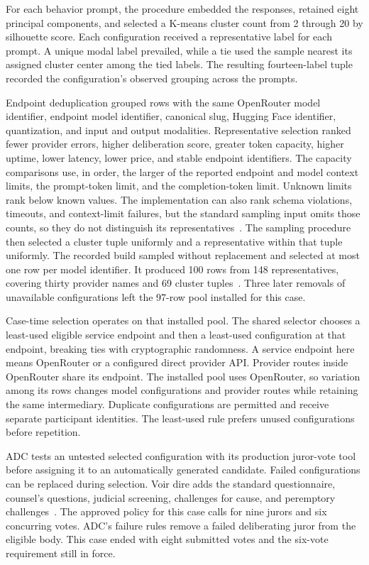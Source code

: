 \documentclass[11pt]{article}
\begin{document}
For each behavior prompt, the procedure embedded the responses, retained eight principal components, and selected a K-means cluster count from 2 through 20 by silhouette score.  Each configuration received a representative label for each prompt.  A unique modal label prevailed, while a tie used the sample nearest its assigned cluster center among the tied labels.  The resulting fourteen-label tuple recorded the configuration's observed grouping across the prompts.

Endpoint deduplication grouped rows with the same OpenRouter model identifier, endpoint model identifier, canonical slug, Hugging Face identifier, quantization, and input and output modalities.  Representative selection ranked fewer provider errors, higher deliberation score, greater token capacity, higher uptime, lower latency, lower price, and stable endpoint identifiers.  The capacity comparisons use, in order, the larger of the reported endpoint and model context limits, the prompt-token limit, and the completion-token limit.  Unknown limits rank below known values.  The implementation can also rank schema violations, timeouts, and context-limit failures, but the standard sampling input omits those counts, so they do not distinguish its representatives~\cite{poolmanual,poolcode}.  The sampling procedure then selected a cluster tuple uniformly and a representative within that tuple uniformly.  The recorded build sampled without replacement and selected at most one row per model identifier.  It produced 100 rows from 148 representatives, covering thirty provider names and 69 cluster tuples~\cite{poolpaper,runbook}.  Three later removals of unavailable configurations left the 97-row pool installed for this case.

Case-time selection operates on that installed pool.  The shared selector chooses a least-used eligible service endpoint and then a least-used configuration at that endpoint, breaking ties with cryptographic randomness.  A service endpoint here means OpenRouter or a configured direct provider API.  Provider routes inside OpenRouter share its endpoint.  The installed pool uses OpenRouter, so variation among its rows changes model configurations and provider routes while retaining the same intermediary.  Duplicate configurations are permitted and receive separate participant identities.  The least-used rule prefers unused configurations before repetition.

ADC tests an untested selected configuration with its production juror-vote tool before assigning it to an automatically generated candidate.  Failed configurations can be replaced during selection.  Voir dire adds the standard questionnaire, counsel's questions, judicial screening, challenges for cause, and peremptory challenges~\cite{juries}.  The approved policy for this case calls for nine jurors and six concurring votes.  ADC's failure rules remove a failed deliberating juror from the eligible body.  This case ended with eight submitted votes and the six-vote requirement still in force.
\end{document}

